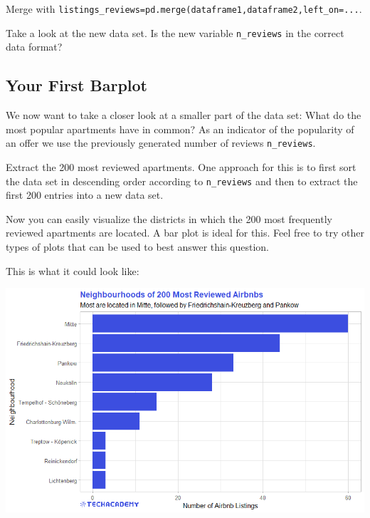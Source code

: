 \documentclass[
  11pt,
]{book}
\newenvironment{tipsp}[1]
  {
  \begin{itemize}
  \footnotesize
  \renewcommand{\labelitemi}{
    \raisebox{-.7\height}[0pt][0pt]{
      {\setkeys{Gin}{width=3em,keepaspectratio}
        \texttt{[image: images/\#1.png]}}
    }
  }
  \setlength{\fboxsep}{1em}
  \begin{pbox}
  \item
  }
  {
  \end{pbox}
  \end{itemize}
  }
\begin{document}
\begin{tipsp}p

Merge with \texttt{listings\_reviews=pd.merge(dataframe1,dataframe2,left\_on=...}.

\end{tipsp}

Take a look at the new data set. Is the new variable \texttt{n\_reviews} in the correct data format?

\hypertarget{your-first-barplot}{%
\subsection{Your First Barplot}\label{your-first-barplot}}

We now want to take a closer look at a smaller part of the data set: What do the most popular apartments have in common? As an indicator of the popularity of an offer we use the previously generated number of reviews \texttt{n\_reviews}.

Extract the 200 most reviewed apartments. One approach for this is to first sort the data set in descending order according to \texttt{n\_reviews} and then to extract the first 200 entries into a new data set.

Now you can easily visualize the districts in which the 200 most frequently reviewed apartments are located. A bar plot is ideal for this. Feel free to try other types of plots that can be used to best answer this question.

This is what it could look like:

\begin{center}\includegraphics[width=1\linewidth]{plot/3_3_Barplot_MostReviewed} \end{center}
\end{document}
